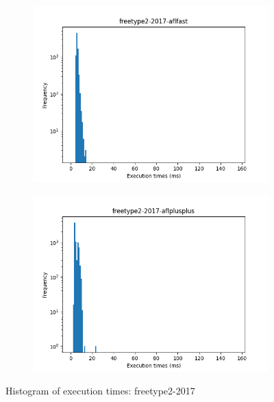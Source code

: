 \begin{figure}
\begin{subfigure}[t]{0.475\textwidth}
        \centering
        \includegraphics[width=\textwidth]{Experiments/execs/freetype2-2017-aflfast.png}
        \caption{}
        \label{fig:sub:freetype-hist-aflfast}
    \end{subfigure}
    \hfill
    \begin{subfigure}[t]{0.475\textwidth}
        \centering
        \includegraphics[width=\textwidth]{Experiments/execs/freetype2-2017-aflplusplus.png}
        \caption{}
        \label{fig:sub:freetype-hist-aflplusplus}
    \end{subfigure}

    \caption{Histogram of execution times: freetype2-2017}
    \label{fig:exe-freetype}
\end{figure}

